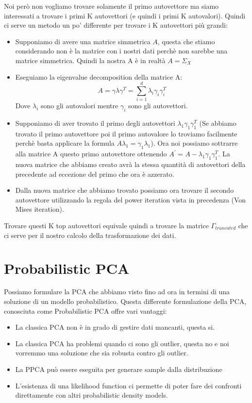 \documentclass[14pt]{extreport}
\begin{document}
Noi però non vogliamo trovare solamente il primo autovettore ma siamo interessati a trovare i primi K autovettori (e quindi i primi K autovalori).
Quindi ci serve un metodo un po' differente per trovare i K autovettori più grandi:
\begin{itemize}
	\item Supponiamo di avere una matrice simmetrica $A$, questa che stiamo considerando non è la matrice con i nostri dati perchè non sarebbe una
	      matrice simmetrica. Quindi la nostra A è in realtà $A = \Sigma_X$
	\item Eseguiamo la eigenvalue decomposition della matrice A: $$A = \gamma \lambda \gamma^T = \sum_{i=1}^d \lambda_i \gamma_i \gamma_i^T$$ Dove
	      $\lambda_i$ sono gli autovalori mentre $\gamma_i$ sono gli autovettori.
	\item Supponiamo di aver trovato il primo degli autovettori $\lambda_1 \gamma_1 \gamma_1^T$ (Se abbiamo trovato il primo autovettore poi il primo
	      autovalore lo troviamo facilmente perchè basta applicare la formula $A\lambda_1= \gamma_1 \lambda_1$). Ora noi possiamo sottrarre alla
	      matrice A questo primo autovettore ottenendo $A^{'} = A - \lambda_1 \gamma_1 \gamma_1^T$. La nuova matrice che abbiamo creato avrà la stessa
	      quantità di autovettori della precedente ad eccezione del primo che ora è azzerato.
	\item Dalla nuova matrice che abbiamo trovato possiamo ora trovare il secondo autovettore utilizzando la regola del power iteration vista in
	precedenza (Von Mises iteration).
\end{itemize}

Trovare questi K top autovettori equivale quindi a trovare la matrice $\Gamma_{truncated}$ che ci serve per il nostro calcolo della trasformazione dei
dati.

\section{Probabilistic PCA}

Possiamo formulare la PCA che abbiamo visto fino ad ora in termini di una soluzione di un modello probabilistico. Questa differente formulazione della
PCA, conosciuta come Probabilistic PCA offre vari vantaggi:
\begin{itemize}
	\item La classica PCA non è in grado di gestire dati mancanti, questa si.
	\item La classica PCA ha problemi quando ci sono gli outlier, questa no e noi vorremmo una soluzione che sia robusta contro gli outlier.
	\item La PPCA può essere eseguita per generare sample dalla distribuzione
	\item L'esistenza di una likelihood function ci permette di poter fare dei confronti direttamente con altri probabilistic density models.
\end{itemize}
\end{document}
